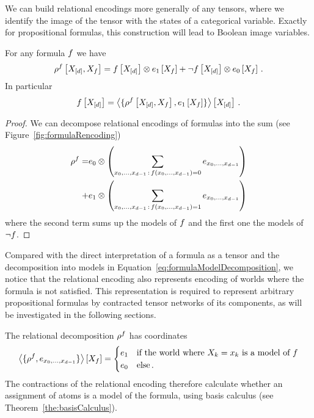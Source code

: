We can build relational encodings more generally of any tensors, where we identify the image of the tensor with the states of a categorical variable.
Exactly for propositional formulas, this construction will lead to Boolean image variables.


\begin{lemma}\label{lem:formulaEncodingDecomposition}
	For any formula $f$ we have
		\[ \rho^{f}\left[X_{[d]},X_{f}\right] 
		= f\left[X_{[d]}\right] \otimes e_{1}\left[X_{f}\right] 
		+ \lnot f\left[X_{[d]}\right] \otimes  e_{0}\left[X_{f}\right] \, . 
		 \]
	In particular
		\[ f\left[X_{[d]}\right] = \left\langle \{
		\rho^{f}\left[X_{[d]},X_{f}\right] , e_{1}\left[X_{f}\right]
		\}\right\rangle \left[ X_{[d]} \right] \, . \]
\end{lemma}
\begin{proof}
	We can decompose relational encodings of formulas into the sum (see Figure~\ref{fig:formulaRencoding}) %
	\begin{align} 
		\rho^{f} = & e_0 \otimes \left( \sum_{{x_{0},\ldots,x_{d-1}}\, : \, f({x_{0},\ldots,x_{d-1}}) = 0}  e_{{x_{0},\ldots,x_{d-1}}} \right) \\
		 + & e_1 \otimes \left( \sum_{{x_{0},\ldots,x_{d-1}}\, : \,  f({x_{0},\ldots,x_{d-1}}) = 1}  e_{{x_{0},\ldots,x_{d-1}}} \right)
	\end{align}
	where the second term sums up the models of $f$ and the first one the models of $\lnot f$.
\end{proof}


Compared with the direct interpretation of a formula as a tensor and the decomposition into models in Equation~\ref{eq:formulaModelDecomposition}, we notice that the relational encoding also represents encoding of worlds where the formula is not satisfied.
This representation is required to represent arbitrary propositional formulas by contracted tensor networks of its components, as will be investigated in the following sections.


The relational decomposition $\rho^{f}$ has coordinates 
\begin{align}
		\left\langle \{\rho^{f},e_{{x_{0},\ldots,x_{d-1}}}\}\right\rangle \left[ X_{f} \right] 
		= \begin{cases}
		e_1 & \text{if the world where $X_{k}=x_{k}$ is a model of $f$}  \\
		e_0 & \text{else}\, .
		\end{cases}
\end{align} 
The contractions of the relational encoding therefore calculate whether an assignment of atoms is a model of the formula, using basis calculus (see Theorem~\ref{the:basisCalculus}).

